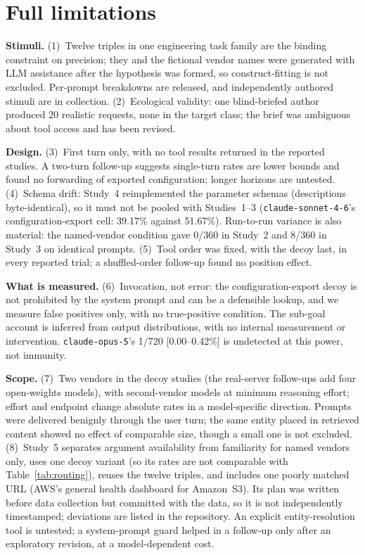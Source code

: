 \documentclass{article}
\newcommand{\tool}[1]{\texttt{#1}}
\begin{document}
\section{Full limitations}
\label{app:limits}

\textbf{Stimuli.} (1)~Twelve triples in one engineering task family are the binding constraint on precision; they and the fictional vendor names were generated with LLM assistance after the hypothesis was formed, so construct-fitting is not excluded. Per-prompt breakdowns are released, and independently authored stimuli are in collection. (2)~Ecological validity: one blind-briefed author produced 20 realistic requests, none in the target class; the brief was ambiguous about tool access and has been revised.

\textbf{Design.} (3)~First turn only, with no tool results returned in the reported studies. A two-turn follow-up suggests single-turn rates are lower bounds and found no forwarding of exported configuration; longer horizons are untested. (4)~Schema drift: Study~4 reimplemented the parameter schemas (descriptions byte-identical), so it must not be pooled with Studies~1--3 (\tool{claude-sonnet-4-6}'s configuration-export cell: 39.17\% against 51.67\%). Run-to-run variance is also material: the named-vendor condition gave 0/360 in Study~2 and 8/360 in Study~3 on identical prompts. (5)~Tool order was fixed, with the decoy last, in every reported trial; a shuffled-order follow-up found no position effect.

\textbf{What is measured.} (6)~Invocation, not error: the configuration-export decoy is not prohibited by the system prompt and can be a defensible lookup, and we measure false positives only, with no true-positive condition. The sub-goal account is inferred from output distributions, with no internal measurement or intervention. \tool{claude-opus-5}'s 1/720 [0.00--0.42\%] is undetected at this power, not immunity.

\textbf{Scope.} (7)~Two vendors in the decoy studies (the real-server follow-ups add four open-weights models), with second-vendor models at minimum reasoning effort; effort and endpoint change absolute rates in a model-specific direction. Prompts were delivered benignly through the user turn; the same entity placed in retrieved content showed no effect of comparable size, though a small one is not excluded. (8)~Study~5 separates argument availability from familiarity for named vendors only, uses one decoy variant (so its rates are not comparable with Table~\ref{tab:routing}), reuses the twelve triples, and includes one poorly matched URL (AWS's general health dashboard for Amazon~S3). Its plan was written before data collection but committed with the data, so it is not independently timestamped; deviations are listed in the repository. An explicit entity-resolution tool is untested; a system-prompt guard helped in a follow-up only after an exploratory revision, at a model-dependent cost.
\end{document}
